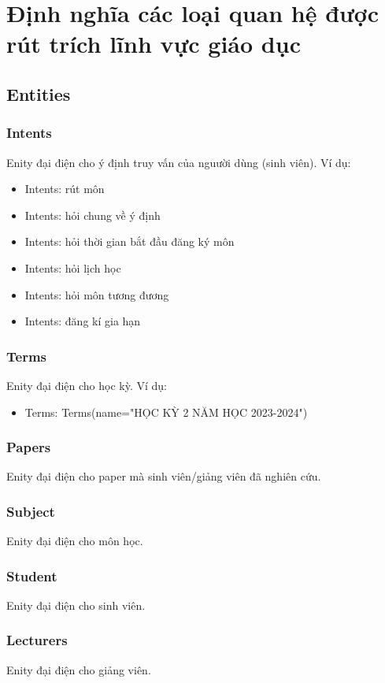 \section{Định nghĩa các loại quan hệ được rút trích lĩnh vực giáo dục}\label{sec:inh-nghia-cac-loai-quan-he-uoc-rut-trich-linh-vuc-giao-duc}
\subsection{Entities}\label{subsec:entities}
\subsubsection{Intents}
Enity đại điện cho ý định truy vấn của nguười dùng (sinh viên). Ví dụ:
\begin{itemize}
    \item Intents: rút môn
    \item Intents: hỏi chung về ý định
    \item Intents: hỏi thời gian bắt đầu đăng ký môn
    \item Intents: hỏi lịch học
    \item Intents: hỏi môn tương đương
    \item Intents: đăng kí gia hạn
\end{itemize}

\subsubsection{Terms}
Enity đại điện cho học kỳ. Ví dụ:
\begin{itemize}
    \item Terms: Terms(name="HỌC KỲ 2 NĂM HỌC 2023-2024")
\end{itemize}
\subsubsection{Papers}
Enity đại điện cho paper mà sinh viên/giảng viên đã nghiên cứu.
\subsubsection{Subject}
Enity đại điện cho môn học.
\subsubsection{Student}
Enity đại điện cho sinh viên.
\subsubsection{Lecturers}
Enity đại điện cho giảng viên.
